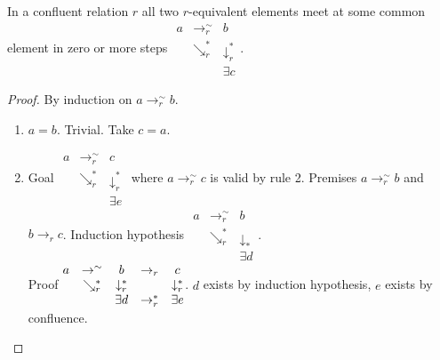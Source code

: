 \begin{theorem} In a confluent relation $r$ all two $r$-equivalent elements
  meet at some common element in zero or more steps
  $
  \begin{matrix}
    a & \to_r^\sim & b \\
    & \searrow_r^* & \downarrow_r^*\\
    & & \exists c
  \end{matrix}
  $.
  \begin{proof}
    By induction on $a \to_r^\sim b$.
    \begin{enumerate}

    \item $a = b$. Trivial. Take $c = a$.

    \item
      Goal
      $\begin{matrix}
        a    & \to_r^\sim      & c                      \\
              & \searrow_r^* & \downarrow_r^*  \\
        & & \exists e
      \end{matrix}$
      where $a \to_r^\sim c$ is valid by rule 2. Premises $a \to_r^\sim b$
      and $b \to_r c$.
      Induction hypothesis
      $\begin{matrix}
        a    & \to_r^\sim      & b                      \\
              & \searrow_r^* & \downarrow_*  \\
        & & \exists d
      \end{matrix}$.\\
      Proof
      $\begin{matrix}
        a & \to^\sim & b & \to_r & c\\
        & \searrow_r^* & \downarrow_r^*  & & \downarrow_r^*\\
        & & \exists d & \to_r^* & \exists e
      \end{matrix}$.
      $d$ exists by induction hypothesis, $e$ exists by confluence.


\end{enumerate}
\end{proof}
\end{theorem}

